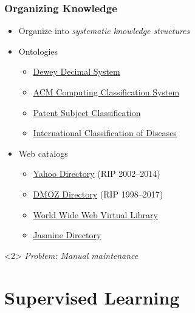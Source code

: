 \documentclass{beamer}
\begin{document}
\begin{frame}
  \frametitle{Organizing Knowledge}

  \begin{itemize}
  \item Organize into \emph{systematic knowledge structures}
  \item Ontologies
    \begin{itemize}
    \item \href{https://en.wikipedia.org/wiki/List_of_Dewey_Decimal_classes}{Dewey Decimal System}
    \item \href{http://dl.acm.org/ccs/ccs.cfm}{ACM Computing Classification System}
    \item \href{http://ip-science.thomsonreuters.com/support/patents/dwpiref/reftools/classification/}{Patent Subject Classification}
    \item \href{http://www.who.int/classifications/icd/en/}{International Classification of Diseases}
    \end{itemize}
  \item Web catalogs
    \begin{itemize}
    \item \href{https://en.wikipedia.org/wiki/Yahoo!_Directory}{Yahoo Directory} (RIP 2002--2014)
    \item \href{http://www.dmoz.org/}{DMOZ Directory} (RIP 1998--2017)
    \item \href{http://vlib.org}{World Wide Web Virtual Library}
    \item \href{https://www.jasminedirectory.com}{Jasmine Directory}
    \end{itemize}
  \end{itemize}

  \begin{block}{}<2>
      \centering
      \emph{Problem: Manual maintenance}
  \end{block}

\end{frame}


\section{Supervised Learning}
\end{document}
